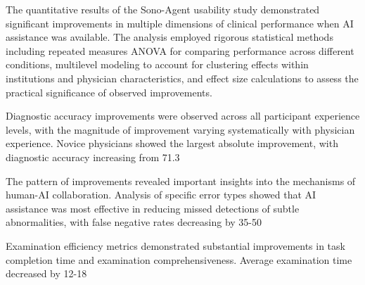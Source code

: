 The quantitative results of the Sono-Agent usability study demonstrated significant improvements in multiple dimensions of clinical performance when AI assistance was available. The analysis employed rigorous statistical methods including repeated measures ANOVA for comparing performance across different conditions, multilevel modeling to account for clustering effects within institutions and physician characteristics, and effect size calculations to assess the practical significance of observed improvements.

Diagnostic accuracy improvements were observed across all participant experience levels, with the magnitude of improvement varying systematically with physician experience. Novice physicians showed the largest absolute improvement, with diagnostic accuracy increasing from 71.3%

The pattern of improvements revealed important insights into the mechanisms of human-AI collaboration. Analysis of specific error types showed that AI assistance was most effective in reducing missed detections of subtle abnormalities, with false negative rates decreasing by 35-50%

Examination efficiency metrics demonstrated substantial improvements in task completion time and examination comprehensiveness. Average examination time decreased by 12-18%

